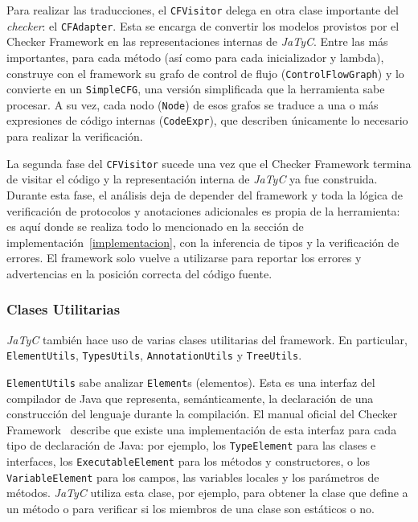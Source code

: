 Para realizar las traducciones, el \texttt{CFVisitor} delega en otra clase importante del \textit{checker}: el \texttt{CFAdapter}. Esta se encarga de convertir los modelos provistos por el Checker Framework en las representaciones internas de \textit{JaTyC}. Entre las más importantes, para cada método (así como para cada inicializador y lambda), construye con el framework su grafo de control de flujo (\texttt{ControlFlowGraph}) y lo convierte en un \texttt{SimpleCFG}, una versión simplificada que la herramienta sabe procesar. A su vez, cada nodo (\texttt{Node}) de esos grafos se traduce a una o más expresiones de código internas (\texttt{CodeExpr}), que describen únicamente lo necesario para realizar la verificación.

La segunda fase del \texttt{CFVisitor} sucede una vez que el Checker Framework termina de visitar el código y la representación interna de \textit{JaTyC} ya fue construida. Durante esta fase, el análisis deja de depender del framework y toda la lógica de verificación de protocolos y anotaciones adicionales es propia de la herramienta: es aquí donde se realiza todo lo mencionado en la sección de implementación~\ref{implementacion}, con la inferencia de tipos y la verificación de errores. El framework solo vuelve a utilizarse para reportar los errores y advertencias en la posición correcta del código fuente.

\subsubsection{Clases Utilitarias}

\textit{JaTyC} también hace uso de varias clases utilitarias del framework. En particular, \texttt{ElementUtils}, \texttt{TypesUtils}, \texttt{AnnotationUtils} y \texttt{TreeUtils}.

\texttt{ElementUtils} sabe analizar \texttt{Element}s (elementos). Esta es una interfaz del compilador de Java que representa, semánticamente, la declaración de una construcción del lenguaje durante la compilación. El manual oficial del Checker Framework~\cite{checker-framework-manual} describe que existe una implementación de esta interfaz para cada tipo de declaración de Java: por ejemplo, los \texttt{TypeElement} para las clases e interfaces, los \texttt{ExecutableElement} para los métodos y constructores, o los \texttt{VariableElement} para los campos, las variables locales y los parámetros de métodos. \textit{JaTyC} utiliza esta clase, por ejemplo, para obtener la clase que define a un método o para verificar si los miembros de una clase son estáticos o no.

